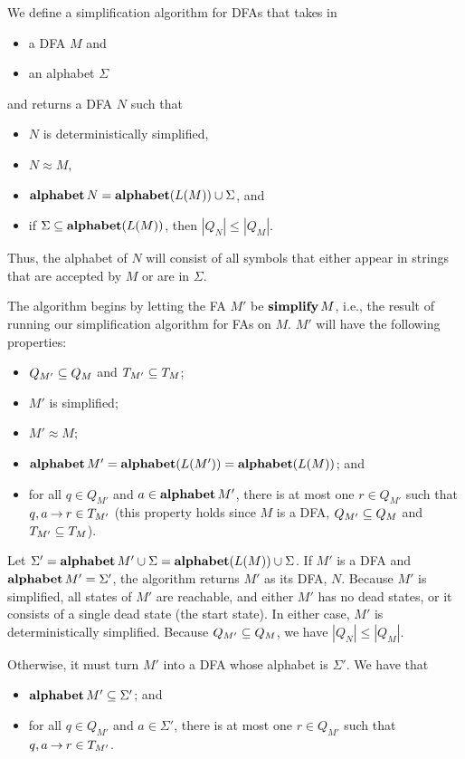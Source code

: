 We define a simplification algorithm for DFAs that takes in
\begin{itemize}
\item a DFA $M$ and
\item an alphabet $\Sigma$
\end{itemize}
and returns a DFA $N$ such that
\begin{itemize}
\item $N$ is deterministically simplified,

\item $N\approx M$,

\item $\mathbf{alphabet}\,N = \mathbf{alphabet}(L(M))\cup\Sigma$, and

\item if $\Sigma\subseteq\mathbf{alphabet}(L(M))$, then $|Q_N| \leq |Q_M|$.
\end{itemize}
Thus, the alphabet of $N$ will consist of all symbols that
either appear in strings that are accepted by $M$ or are in $\Sigma$.

The algorithm begins by letting the FA $M'$ be $\mathbf{simplify}\,M$, i.e.,
the result of running our simplification algorithm for FAs on $M$.
$M'$ will have the following properties:
\begin{itemize}
\item $Q_{M'}\subseteq Q_M$ and $T_{M'}\subseteq T_M$;

\item $M'$ is simplified;

\item $M'\approx M$;

\item $\mathbf{alphabet}\,M'=\mathbf{alphabet}(L(M'))=\mathbf{alphabet}(L(M))$; and

\item for all $q\in Q_{M'}$ and $a\in\mathbf{alphabet}\,M'$, there is at most
  one $r\in Q_{M'}$ such that $q,a\mathbin{\to} r\in T_{M'}$ (this property
  holds since $M$ is a DFA, $Q_{M'}\subseteq Q_M$ and $T_{M'}\subseteq T_M$).
\end{itemize}

Let $\Sigma'=\mathbf{alphabet}\,M'\cup\Sigma=\mathbf{alphabet}(L(M))\cup\Sigma$.  If
$M'$ is a DFA and $\mathbf{alphabet}\,M'=\Sigma'$, the algorithm returns $M'$
as its DFA, $N$. Because $M'$ is simplified, all states of $M'$ are
reachable, and either $M'$ has no dead states, or it consists
of a single dead state (the start state). In either case, $M'$
is deterministically simplified. Because $Q_{M'}\subseteq Q_M$, we
have $|Q_N| \leq |Q_M|$.

Otherwise, it must turn $M'$ into a DFA whose alphabet is $\Sigma'$.
We have that
\begin{itemize}
\item $\mathbf{alphabet}\,M'\subseteq\Sigma'$; and

\item for all $q\in Q_{M'}$ and $a\in\Sigma'$, there is at most one
  $r\in Q_{M'}$ such that $q,a\mathbin{\to} r\in T_{M'}$.
\end{itemize}

